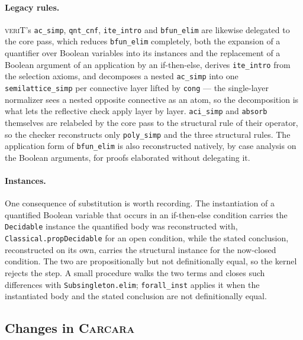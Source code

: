 \documentclass[runningheads]{llncs}
\newcommand{\carcara}{\textsc{Carcara}\xspace}
\newcommand{\verit}{\textsc{veriT}\xspace}
\newcommand{\rulename}[1]{\texttt{#1}}
\begin{document}
\paragraph{Legacy rules.} \verit's \rulename{ac\_simp}, \rulename{qnt\_cnf},
\rulename{ite\_intro} and \rulename{bfun\_elim} are likewise delegated to the
core pass, which reduces \rulename{bfun\_elim} completely, both the expansion
of a quantifier over Boolean variables into its instances and the replacement
of a Boolean argument of an application by an if-then-else, derives
\rulename{ite\_intro} from the selection axioms, and decomposes a nested
\rulename{ac\_simp} into one \rulename{semilattice\_simp} per connective layer
lifted by \rulename{cong} --- the single-layer normalizer sees a nested
opposite connective as an atom, so the decomposition is what lets the
reflective check apply layer by layer. \rulename{aci\_simp} and
\rulename{absorb} themselves are relabeled by the core pass to the structural
rule of their operator, so the checker reconstructs only \rulename{poly\_simp}
and the three structural rules. The application form of \rulename{bfun\_elim}
is also reconstructed natively, by case analysis on the Boolean arguments, for
proofs elaborated without delegating it.

\paragraph{Instances.} One consequence of substitution is worth recording.
The instantiation of a quantified Boolean variable that occurs in an
if-then-else condition carries the \texttt{Decidable} instance the
quantified body was reconstructed with, \lstinline{Classical.propDecidable}
for an open condition, while the stated conclusion, reconstructed on its
own, carries the structural instance for the now-closed condition. The two
are propositionally but not definitionally equal, so the kernel rejects the
step. A small procedure walks the two terms and closes such differences with
\lstinline{Subsingleton.elim}; \rulename{forall\_inst} applies it when the
instantiated body and the stated conclusion are not definitionally equal.

\subsection{Changes in \carcara}
\label{sec:carcara}
\end{document}
